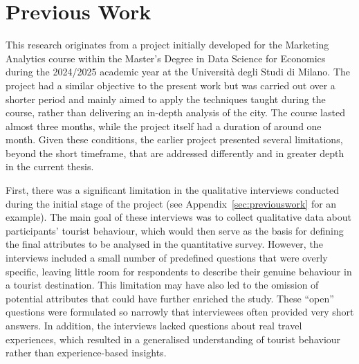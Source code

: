 \documentclass[a4paper, 12pt, twoside]{report}  %
\begin{document}
\section{Previous Work}

\indent This research originates from a project initially developed for the Marketing Analytics course within the Master’s Degree in Data Science for Economics during the 2024/2025 academic year at the Università degli Studi di Milano. The project had a similar objective to the present work but was carried out over a shorter period and mainly aimed to apply the techniques taught during the course, rather than delivering an in-depth analysis of the city. The course lasted almost three months, while the project itself had a duration of around one month. Given these conditions, the earlier project presented several limitations, beyond the short timeframe, that are addressed differently and in greater depth in the current thesis.

\indent First, there was a significant limitation in the qualitative interviews conducted during the initial stage of the project (see Appendix~\ref{sec:previouswork} for an example). The main goal of these interviews was to collect qualitative data about participants’ tourist behaviour, which would then serve as the basis for defining the final attributes to be analysed in the quantitative survey. However, the interviews included a small number of predefined questions that were overly specific, leaving little room for respondents to describe their genuine behaviour in a tourist destination. This limitation may have also led to the omission of potential attributes that could have further enriched the study. These “open” questions were formulated so narrowly that interviewees often provided very short answers. In addition, the interviews lacked questions about real travel experiences, which resulted in a generalised understanding of tourist behaviour rather than experience-based insights.
\end{document}
